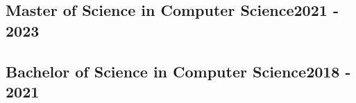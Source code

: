 \vspace*{10pt}
\subsection {{Master of Science in Computer Science}\hfill 2021 - 2023}

\vspace*{6pt}
\subsection {{Bachelor of Science in Computer Science}\hfill 2018 - 2021}
